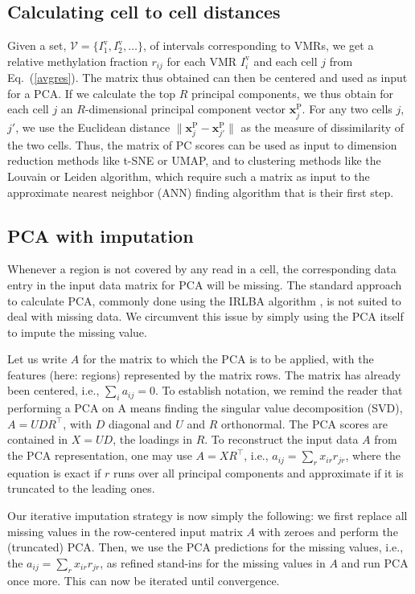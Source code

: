 \documentclass[twocolumn,10pt]{article}
\begin{document}
\subsection{Calculating cell to cell distances}

Given a set, $\mathcal{V}=\{I^\text{v}_1,I^\text{v}_2,\dots\}$, of intervals corresponding to VMRs, we get a relative methylation fraction $r_{ij}$ for each VMR $I^\text{v}_i$ and each cell $j$ from Eq.\ (\ref{avgres}).
The matrix thus obtained can then be centered and used as input for a PCA.
If we calculate the top $R$ principal components, we thus obtain for each cell $j$ an $R$-dimensional principal component vector $\mathbf{x}^\text{P}_j$.
For any two cells $j$, $j'$, we use the Euclidean distance $\|\mathbf{x}^\text{P}_j - \mathbf{x}^\text{P}_{j'}\|$ as the measure of dissimilarity of the two cells.
Thus, the matrix of PC scores can be used as input to dimension reduction methods like t-SNE or UMAP, and to clustering methods like the Louvain or Leiden algorithm, which require such a matrix as input to the approximate nearest neighbor (ANN) finding algorithm that is their first step.

\subsection{PCA with imputation}

Whenever a region is not covered by any read in a cell, the corresponding data entry in the input data matrix for PCA will be missing.
The standard approach to calculate PCA, commonly done using the IRLBA algorithm \citep{Baglama2005}, is not suited to deal with missing data.
We circumvent this issue by simply using the PCA itself to impute the missing value.

Let us write $A$ for the matrix to which the PCA is to be applied, with the features (here: regions) represented by the matrix rows.
The matrix has already been centered, i.e., $\sum_i a_{ij}=0$.
To establish notation, we remind the reader that performing a PCA on A means finding the singular value decomposition (SVD), $A=UDR^\top$, with $D$ diagonal and $U$ and $R$ orthonormal.
The PCA scores are contained in $X=UD$, the loadings in $R$.
To reconstruct the input data $A$ from the PCA representation, one may use $A=XR^\top$, i.e., $a_{ij}=\sum_r x_{ir} r_{jr}$, where the equation is exact if $r$ runs over all principal components and approximate if it is truncated to the leading ones.

Our iterative imputation strategy is now simply the following: we first replace all missing values in the row-centered input matrix $A$ with zeroes and perform the (truncated) PCA.
Then, we use the PCA predictions for the missing values, i.e., the $a_{ij}=\sum_r x_{ir} r_{jr}$, as refined stand-ins for the missing values in $A$ and run PCA once more.
This can now be iterated until convergence.
\end{document}
